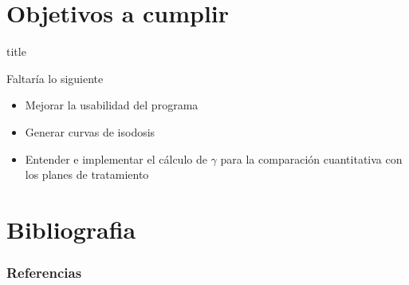 \documentclass[12pt]{beamer}
\begin{document}
\section{Objetivos a cumplir}
\begin{frame}
\vfill
\centering
\begin{beamercolorbox}[sep=8pt,center,shadow=true,rounded=true]{title}
	\insertsectionhead\par%
\end{beamercolorbox}
\vfill
\end{frame}

\begin{frame}
Faltaría lo siguiente
\begin{itemize}
	\item Mejorar la usabilidad del programa
	\item Generar curvas de isodosis
	\item Entender e implementar el cálculo de $\gamma$ para la comparación cuantitativa con los planes de tratamiento
\end{itemize}
\end{frame}



\section{Bibliografia}
\begin{frame}[allowframebreaks]
\frametitle{Referencias}
\nocite{*}


\end{frame}
\end{document}
